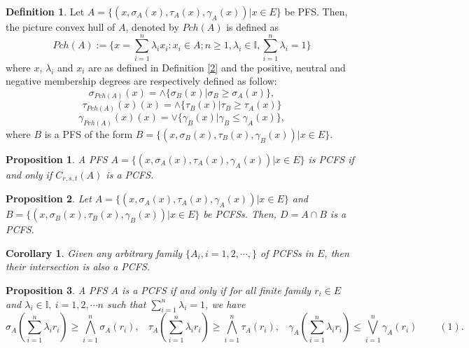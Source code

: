 \documentclass[12pt,letterpaper]{amsart}
\theoremstyle{plain}
\newtheorem{proposition}{Proposition}[section]
\newtheorem{corollary}{Corollary}[section]
\theoremstyle{definition}
\newtheorem{definition}{Definition}[section]
\numberwithin{equation}{section}
\begin{document}
\begin{definition}\cite{s1}
Let $A = \lbrace (x, \sigma_{A}(x), \tau_{A}(x), \gamma_{A}(x))| x \in E \rbrace$ be PFS. Then, the picture convex hull of $A$, denoted by $Pch(A)$ is defined as $$Pch(A):= \lbrace x = \sum \limits_{i=1}^{n} \lambda_{i} x_i : x_{i} \in A; n \geq 1, \lambda_{i} \in \mathbb{I}, \sum \limits_{i=1}^{n} \lambda_{i} = 1 \rbrace$$ where $x$, $\lambda_i$ and $x_i$ are as defined in Definition \ref{2} and the positive, neutral and negative membership degrees are respectively defined as follow: $$\sigma_{Pch(A)}(x) = \wedge \lbrace \sigma_{B}(x) | \sigma_{B} \geq \sigma_{A}(x)\rbrace,$$ $$\tau_{Pch(A)}(x)(x) = \wedge \lbrace \tau_{B}(x) | \tau_{B} \geq \tau_{A}(x)\rbrace$$ $$\gamma_{Pch(A)}(x)(x) = \vee \lbrace \gamma_{B}(x) | \gamma_{B} \leq \gamma_{A}(x)\rbrace,$$ where $B$ is a PFS of the form $B = \lbrace ( x, \sigma_{B}(x), \tau_{B}(x), \gamma_{B}(x) ) | x \in E \rbrace$.  
\end{definition}

\begin{proposition} \cite{s1}
A PFS $A = \lbrace ( x, \sigma_{A}(x), \tau_{A}(x), \gamma_{A}(x) ) | x \in E \rbrace$ is PCFS if and only if $C_{r, s, t} (A)$ is a PCFS.
\end{proposition}

\begin{proposition} \cite{s1}
Let $A = \lbrace ( x, \sigma_{A}(x), \tau_{A}(x), \gamma_{A}(x) ) | x \in E \rbrace$ and $B = \lbrace ( x, \sigma_{B}(x), \tau_{B}(x), \gamma_{B}(x) ) | x \in E \rbrace$ be PCFSs. Then, $D = A \cap B$ is a PCFS.
\end{proposition}

\begin{corollary} \cite{s1}
Given any arbitrary family $\{ A_i, i = 1, 2, \cdots, \}$ of PCFSs in $E$, then their intersection is also a PCFS.
\end{corollary}

\begin{proposition} \cite{s1}
A PFS $A$ is a PCFS if and only if for all finite family $r_{i} \in E$ and $\lambda_{i} \in \mathbb{I},~ i = 1, 2, \cdots n$ such that $\sum \limits_{i=1}^{n} \lambda_i = 1$, we have $$\sigma_{A} \left(\sum \limits_{i=1}^{n} \lambda_{i} r_{i} \right) \geq \bigwedge^{n}_{i=1} \sigma_{A} (r_i),~~~~\tau_{A} \left(\sum \limits_{i=1}^{n} \lambda_{i} r_{i} \right) \geq \bigwedge^{n}_{i=1} \tau_{A} (r_i), ~~~~\gamma_{A} \left(\sum \limits_{i=1}^{n} \lambda_{i} r_{i} \right) \leq \bigvee^{n}_{i=1} \gamma_{A} (r_i) \ \ \ \ \ \ \ \ \ \ (1).$$ 
\end{proposition}
\end{document}
